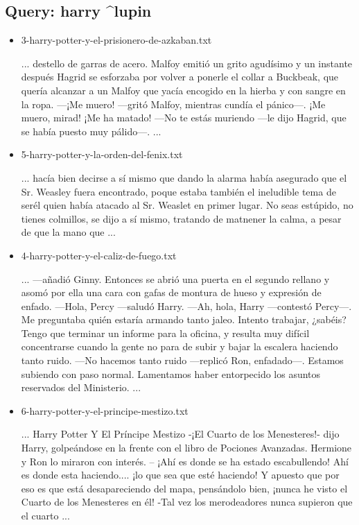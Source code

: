\documentclass[a4paper,12pt,]{article}
\begin{document}
\subsection*{Query: harry \^{}lupin}
\begin{itemize}
    \item 3-harry-potter-y-el-prisionero-de-azkaban.txt
    
    ... destello de garras de acero. Malfoy emitió un grito agudísimo y un instante después Hagrid se esforzaba 
    por volver a ponerle el collar a Buckbeak, que quería alcanzar a un Malfoy que yacía encogido en la hierba y 
    con sangre en la ropa. —¡Me muero! —gritó Malfoy, mientras cundía el pánico—. ¡Me muero, mirad! ¡Me ha matado! 
    —No te estás muriendo —le dijo Hagrid, que se había puesto muy pálido—. ...

    \item 5-harry-potter-y-la-orden-del-fenix.txt
    
    ...  hacía bien decirse a sí mismo que dando la alarma había asegurado que el Sr. Weasley fuera encontrado, 
    poque estaba también el ineludible tema de serél quien había atacado al Sr. Weaslet en primer lugar. No seas 
    estúpido, no tienes colmillos, se dijo a sí mismo, tratando de matnener la calma, a pesar de que la mano que  
    ...

    \item 4-harry-potter-y-el-caliz-de-fuego.txt
    
    ... —añadió Ginny. Entonces se abrió una puerta en el segundo rellano y asomó por ella una cara con gafas de 
    montura de hueso y expresión de enfado. —Hola, Percy —saludó Harry. —Ah, hola, Harry —contestó Percy—. Me 
    preguntaba quién estaría armando tanto jaleo. Intento trabajar, ¿sabéis? Tengo que terminar un informe para la 
    oficina, y resulta muy difícil concentrarse cuando la gente no para de subir y bajar la escalera haciendo tanto 
    ruido. —No hacemos tanto ruido —replicó Ron, enfadado—. Estamos subiendo con paso normal. Lamentamos haber 
    entorpecido los asuntos reservados del Ministerio. ...

    \item 6-harry-potter-y-el-principe-mestizo.txt
    
    ... Harry Potter Y El Príncipe Mestizo -¡El Cuarto de los Menesteres!- dijo Harry, golpeándose en la frente con 
    el libro de Pociones Avanzadas. Hermione y Ron lo miraron con interés. – ¡Ahí es donde se ha estado escabullendo! 
    Ahí es donde esta haciendo.... ¡lo que sea que esté haciendo! Y apuesto que por eso es que está desapareciendo 
    del mapa, pensándolo bien, ¡nunca he visto el Cuarto de los Menesteres en él! -Tal vez los merodeadores nunca 
    supieron que el cuarto ...
\end{itemize}
\end{document}
